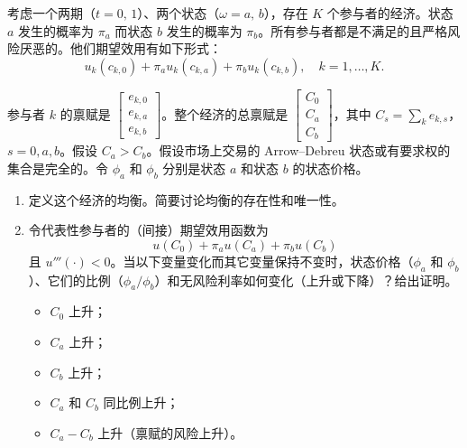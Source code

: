 
\par\noindent\begin{minipage}{\linewidth}
\begin{problem}
 考虑一个两期（$t=0,\,1$）、两个状态（$\omega=a,\,b$），存在 $K$ 个参与者的经济。状态 $a$ 发生的概率为 $\pi_{a}$ 而状态 $b$ 发生的概率为 $\pi_{b}$。所有参与者都是不满足的且严格风险厌恶的。他们期望效用有如下形式：
\[
    u_{k}(c_{k,0})+\pi_{a}u_{k}(c_{k,a})+\pi_{b}u_{k}(c_{k,b}),\quad k=1,\dots,K.
\]

参与者 $k$ 的禀赋是 $\begin{bmatrix}e_{k,0} \\ e_{k,a} \\ e_{k,b}\end{bmatrix}$。整个经济的总禀赋是 $\begin{bmatrix}C_{0} \\ C_{a} \\ C_{b}\end{bmatrix}$，其中 $C_{s}=\sum_{k}e_{k,s}$，$s=0,a,b$。假设 $C_{a}>C_{b}$。假设市场上交易的 Arrow--Debreu 状态或有要求权的集合是完全的。令 $\phi_{a}$ 和 $\phi_{b}$ 分别是状态 $a$ 和状态 $b$ 的状态价格。
\begin{enumerate}[label=(\alph*)]
    \item 定义这个经济的均衡。简要讨论均衡的存在性和唯一性。
    \item 令代表性参与者的（间接）期望效用函数为
    \[
        u(C_{0})+\pi_{a}u(C_{a})+\pi_{b}u(C_{b})
    \]
    且 $u'''(\cdot)<0$。当以下变量变化而其它变量保持不变时，状态价格（$\phi_{a}$ 和 $\phi_{b}$）、它们的比例（$\phi_{a}/\phi_{b}$）和无风险利率如何变化（上升或下降）？给出证明。
    \begin{itemize}
        \item $C_{0}$ 上升；
        \item $C_{a}$ 上升；
        \item $C_{b}$ 上升；
        \item $C_{a}$ 和 $C_{b}$ 同比例上升；
        \item $C_{a}-C_{b}$ 上升（禀赋的风险上升）。
    \end{itemize}
\end{enumerate}
\end{problem}
\end{minipage}\par
{}
